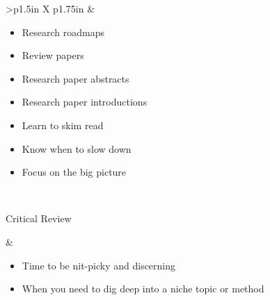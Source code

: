 \documentclass[8pt]{extarticle}
\begin{document}
\begin{tabularx}{\linewidth}{>{\bfseries}p{1.5in} X p{1.75in}}
                    &   \begin{minipage}[t]{\linewidth}
                            \vspace{0pt}

                            \begin{sourcesBox}
                            \begin{itemize}[nosep,leftmargin=*]
                                \item Research roadmaps
                                \item Review papers
                                \item Research paper abstracts
                                \item Research paper introductions
                            \end{itemize}
                            \end{sourcesBox}

                            \begin{tipsBox}
                            \begin{itemize}[nosep,leftmargin=*]
                                \item Learn to skim read
                                \item Know when to slow down
                                \item Focus on the big picture
                            \end{itemize}
                            \end{tipsBox}
                        \end{minipage}

                            \\

    \addlinespace %

    \begin{minipage}[t]{\linewidth}
        \vspace{0pt}
        Critical Review
    \end{minipage}

            &   \begin{minipage}[t]{\linewidth}
                    \vspace{0pt}

                    \begin{whatBox}
                    \begin{itemize}[nosep,leftmargin=*]
                        \item Time to be nit-picky and discerning
                        \item When you need to dig deep into a niche topic or method
                    \end{itemize}
                    \end{whatBox}


\end{minipage}
\end{tabularx}
\end{document}

